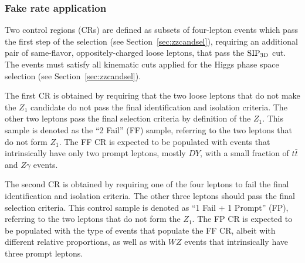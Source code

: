 \subsubsection{Fake rate application}
\label{sec:zxA}

Two control regions (CRs) are defined as subsets of four-lepton events
which pass the first step of the selection (see
Section~\ref{sec:zzcandsel}), requiring an additional pair of 
same-flavor, oppositely-charged loose leptons, that pass the ${\rm SIP_{3D}}$ cut. 
The events must satisfy all kinematic cuts applied for the Higgs phase space selection
(see Section~\ref{sec:zzcandsel}).

The first CR is obtained by
requiring that the two loose leptons that do not make the $Z_1$ candidate 
do not pass the final identification and
isolation criteria.
The other two leptons pass
the final selection criteria by definition of the $Z_1$. 
This sample is denoted as the ``2
Fail'' (FF) sample, referring to the two leptons that do not form $Z_1$. The FF CR is expected to be populated with
events that intrinsically have only two prompt leptons, mostly $DY$, with a small fraction of $t \bar{t}$ and $Z \gamma$ events.

The second CR is obtained by requiring one of
the four leptons to fail the final identification and isolation
criteria.
The other three
leptons should pass the final selection criteria. This control sample
is denoted as ``1 Fail + 1 Prompt'' (FP), referring to the two leptons that do not form the $Z_1$. The FP CR is
expected to be populated with the type of events that populate the
FF CR, 
albeit with different relative proportions,
as well as with $WZ$ events that intrinsically have three
prompt leptons. 



